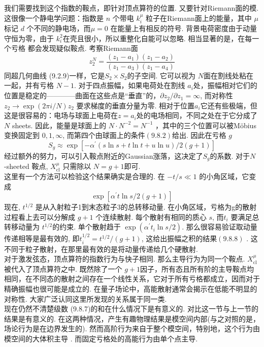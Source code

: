 我们需要找到这个指数的鞍点，即针对顶点算符的位置. 又要针对Riemann面的模. 这很像一个静电学问题：指数是 $n$ 个带电 $k_{i}^{\mu}$ 粒子在Riemann面上的能量，其中 $\mu$ 标记 $d$ 个不同的静电场，而$\mu=0$ 在能量上有相反的符号. 背景电荷密度由于动量守恒为零，由于 $k_{i}^{2}$在壳且很小，所以重整化自能可以忽略. 相当显著的是，在每一个亏格 都会发现疑似鞍点. 考察Riemann面
\begin{equation}
	z_{2}^{N}=\frac{\left(z_{1}-a_{1}\right)\left(z_{1}-a_{2}\right)}{\left(z_{1}-a_{3}\right)\left(z_{1}-a_{4}\right)}
\end{equation}
同超几何曲线 (9.2.9)一样，它是$S_{2} \times S_{2}$的子空间. 它可以视为 $N$面在割线处粘在一起，并有亏格 $N-1$. 对于四点振幅，如果电荷处在割线 $a_{i}$处，振幅相对它们的位置是稳定的————曲面在这些点是“垂直”的，$\partial z_{2} / \partial z_{1}=\infty$, 而对称性 $z_{2} \rightarrow \exp (2 \pi i / N) z_{2}$ 要求梯度的垂直分量为零.
相对于位置$a_{i}$它还有些极端，但这是很容易的：电场与球面上电荷在$z=a_{i}$处的电场相同，不同之处在于它分成了$N$ sheets. 因此，能量是球面上的 $N \cdot N^{-2}=N^{-1}$ ，其中的三个位置可以被Möbius变换固定到 $0,1, \infty$, 而第四个由球面上的条件$(9.8 .2)$给出. 因此在亏格 $g$
\begin{equation}
	S_{g} \approx \exp \left[-\alpha^{\prime}(s \ln s+t \ln t+u \ln u) / 2(g+1)\right]
\end{equation}
经过额外的努力，可以引入鞍点附近的Gaussian涨落，这决定了$S_{g} $的系数. 对于$N$ -sheeted 鞍点, $X_{\mathrm{cl}}^{\mu}$ 只需除以 $N=g+1$即可.\\
这里有一个方法可以检验这个结果确实是合理的. 在 $-t / s \ll 1$ 的小角区域，它变成
\begin{equation}
	\exp \left[\alpha^{\prime} t \ln s / 2(g+1)\right]
\end{equation}
现在, $t^{1 / 2}$ 是从入射粒子1到末态粒子3的总转移动量. 在小角区域，亏格为g的散射过程看上去可以分解成 $g+1$ 个连续散射. 每个散射有相同的质心 $s$, 而$t_{i}$ 要满足总转移动量为 $t^{1 / 2}$的约束. 单个散射趋于 $\exp \left(\alpha^{\prime} t_{i} \ln s / 2\right)$. 那么很容易验证取动量传递相等是最有效的, 即$t_{i}^{1 / 2}=t^{1 / 2} /(g+1)$, 这给出振幅之积的结果$(9.8 .8)$ . 这不同于粒子散射，在那里最有效的是将动量传递给几个硬散射.\\
对于激发弦态，顶点算符的指数行为与快子相同. 那么主导行为为同一个鞍点.  $X_{\mathrm{cl}}^{\mu}$被代入了顶点算符之中. 既然除了一个 $g+1$因子，所有态且所有阶的主导鞍点均相同，在不同态的散射之间存在一个线性关系，它对于所有亏格都成立，因而对于精确振幅也很可能是成立的. 在量子场论中，高能散射通常会揭示在低能不明显的对称性. 大家广泛认同这里所发现的关系属于同一类.\\
现在仍然不清楚级数 (9.8.7)的和在什么情况下是有意义的. 对比这一节与上一节的结果是有意义的. 在这两种情况，产生有趣物理结果是模空间内部(与之对照的是，场论行为是在边界发生的). 然而高阶行为来自于整个模空间，特别地，这个行为由模空间的大体积主导 . 而固定亏格处的高能行为由单个点主导.

